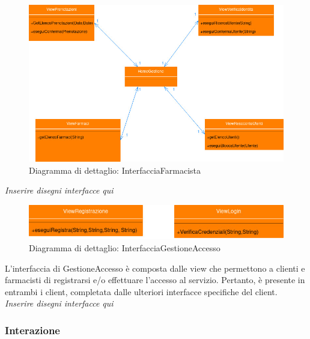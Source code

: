 \newpage

\begin{figure}[h!]
    \begin{center}
        \includegraphics[width=\textwidth]{immagini/ViewFarmacia-progettazione.jpg}
        \caption{Diagramma di dettaglio: InterfacciaFarmacista}
    \end{center}
\end{figure}

\textit{Inserire disegni interfacce qui}

\newpage

\begin{figure}[h!]
    \begin{center}
        \includegraphics[width=\textwidth]{immagini/ViewGestioneAccesso.jpg}
        \caption{Diagramma di dettaglio: InterfacciaGestioneAccesso}
    \end{center}
\end{figure}

L'interfaccia di GestioneAccesso è composta dalle view che permettono a clienti e farmacisti di registrarsi e/o effettuare l'accesso al servizio.
Pertanto, è presente in entrambi i client, completata dalle ulteriori interfacce specifiche del client.
\\

\textit{Inserire disegni interfacce qui}

\newpage

\subsubsection{Interazione}

